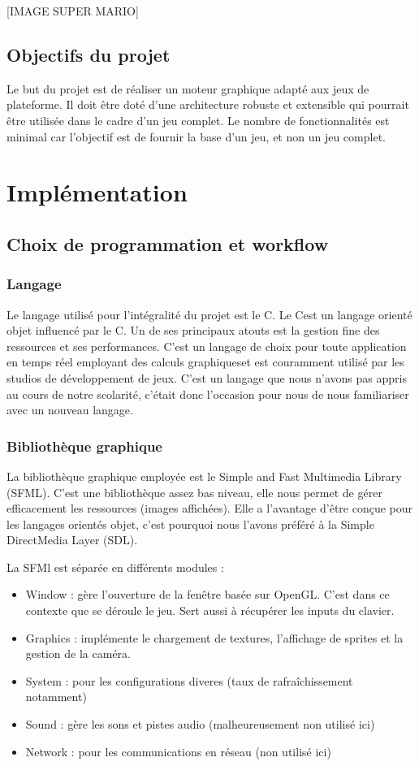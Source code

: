 \documentclass[a4paper,11pt]{article}
\newcommand{\CC}{C\nolinebreak\hspace{-.05em}\raisebox{.4ex}{\tiny\bf +}\nolinebreak\hspace{-.10em}\raisebox{.4ex}{\tiny\bf +}}
\begin{document}
[IMAGE SUPER MARIO]


\subsection{Objectifs du projet}
Le but du projet est de réaliser un moteur graphique adapté aux jeux de plateforme. Il doit être doté d'une architecture robuste et extensible qui pourrait être utilisée dans le cadre d'un jeu complet. Le nombre de fonctionnalités est minimal car l'objectif est de fournir la base d'un jeu, et non un jeu complet.
    
\section{Implémentation}
\subsection{Choix de programmation et workflow}
\subsubsection*{Langage}
Le langage utilisé pour l'intégralité du projet est le \CC .
Le \CC est un langage orienté objet influencé par le C. Un de ses principaux atouts est la gestion fine des ressources et ses performances. C'est un langage de choix pour toute application en temps réel employant des calculs graphiqueset est couramment utilisé par les studios de développement de jeux.
C'est un langage que nous n'avons pas appris au cours de notre scolarité, c'était donc l'occasion pour nous de nous familiariser avec un nouveau langage.

\subsubsection*{Bibliothèque graphique}
La bibliothèque graphique employée est le Simple and Fast Multimedia Library (SFML). C'est une bibliothèque assez bas niveau, elle nous permet de gérer efficacement les ressources (images affichées). Elle a l'avantage d'être conçue pour les langages orientés objet, c'est pourquoi nous l'avons préféré à la Simple DirectMedia Layer (SDL).

La SFMl est séparée en différents modules :
\begin{itemize}
\item Window : gère l'ouverture de la fenêtre basée sur OpenGL. C'est dans ce contexte que se déroule le jeu. Sert aussi à récupérer les inputs du clavier.
\item Graphics : implémente le chargement de textures, l'affichage de sprites et la gestion de la caméra.
\item System : pour les configurations diveres (taux de rafraîchissement notamment)
\item Sound : gère les sons et pistes audio (malheureusement non utilisé ici)
\item Network : pour les communications en réseau (non utilisé ici)
\end{itemize}
\end{document}
